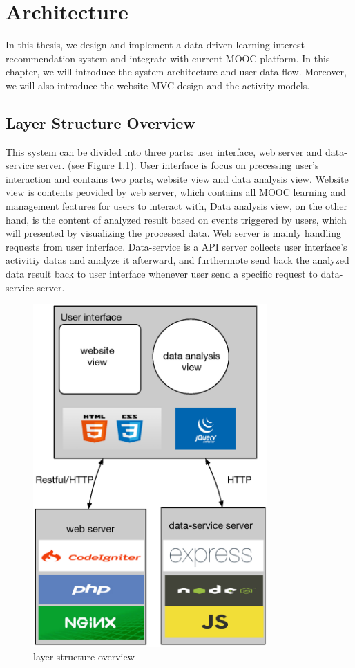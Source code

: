 \chapter{Architecture}
In this thesis, we design and implement a data-driven learning interest recommendation system and integrate with current MOOC platform.
In this chapter, we  will introduce the system architecture and user data flow.
Moreover, we will also introduce the website MVC design and the activity models.

\section{Layer Structure Overview}
This system can be divided into three parts: user interface, web server and data-service server. (see Figure \ref{fig:layer-overview}).
User interface is focus on precessing user's interaction and contains two parts, website view and data analysis view.
Website view is contents peovided by web server, which contains all MOOC learning and management features for users to interact with,
Data analysis view, on the other hand, is the content of analyzed result based on events triggered by users, which will presented by visualizing the processed data.
Web server is mainly handling requests from user interface.
Data-service is a API server collects user interface's activitiy datas and analyze it afterward, and furthermote send back the analyzed data result back to user interface whenever user send a specific request to data-service server.

\begin{figure}[H]
    \centering
    \includegraphics[width = 0.8\textwidth]{fig/layer-structure-overview.eps}
    \caption{layer structure overview}
    \label{fig:layer-overview}
\end{figure}

